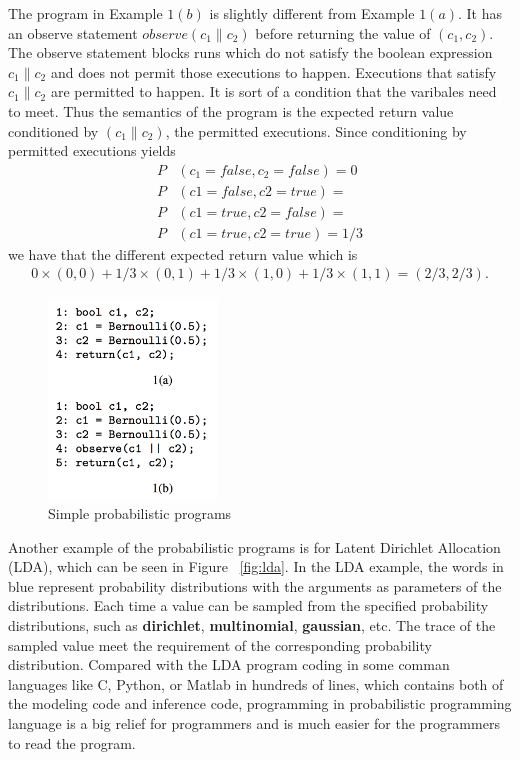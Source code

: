 The program in Example $1(b)$ is slightly different from Example $1(a)$. It has an observe statement $observe(c_1 \| c_2)$ before returning the value of $(c_1,c_2)$. The observe statement blocks runs which do not satisfy the boolean expression $c_1 \| c_2$ and does not permit those executions to happen. Executions that satisfy $c_1 \| c_2$ are permitted to happen. It is sort of a condition that the varibales need to meet. Thus the semantics of the program is the expected return value conditioned by $(c_1 \| c_2)$, the permitted executions. Since conditioning by permitted executions yields
\begin{align*}
  P & (c_1=false,c_2=false) = 0 \\
  P & (c1=false,c2=true) = \\
  P & (c1=true,c2=false) = \\
  P & (c1=true,c2=true) = 1/3
\end{align*}
we have that the different expected return value which is 
\begin{align*}
  0 \times (0,0) + 1/3 \times (0,1) + 1/3 \times (1,0) + 1/3 \times (1,1) = (2/3,2/3).
\end{align*}

\begin{figure}
    \centering
    \includegraphics[width=0.4\textwidth]{figures/pp_simple_eg.png}
    \caption{Simple probabilistic programs}
    \label{fig:pp_simple_eg}
\end{figure}

Another example of the probabilistic programs is for Latent Dirichlet Allocation (LDA), which can be seen in Figure ~\ref{fig:lda}. In the LDA example, the words in blue represent probability distributions with the arguments as parameters of the distributions. Each time a value can be sampled from the specified probability distributions, such as \textbf{dirichlet}, \textbf{multinomial}, \textbf{gaussian}, etc. The trace of the sampled value meet the requirement of the corresponding probability distribution. Compared with the LDA program coding in some comman languages like C, Python, or Matlab in hundreds of lines, which contains both of the modeling code and inference code, programming in probabilistic programming language is a big relief for programmers and is much easier for the programmers to read the program.

